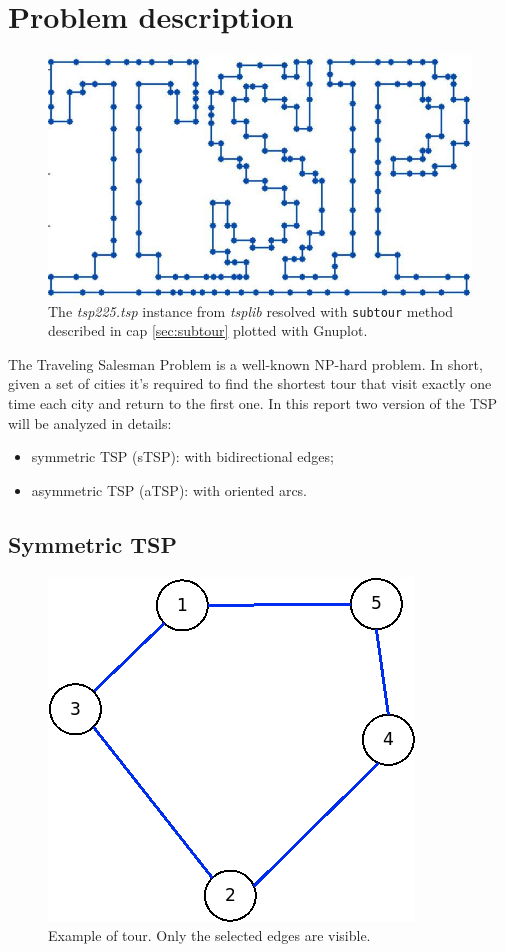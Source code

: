 \chapter{Problem description}
\label{chapter:TSPdescription}
\begin{figure}[h]
	\centering
	\includegraphics[width=.5\columnwidth]{img/tsp225_plot}
	\caption{The \textit{tsp225.tsp} instance from \textit{tsplib} resolved with \texttt{subtour} method described in cap \ref{sec:subtour} plotted with Gnuplot.}
	\label{fig:tsp225}
\end{figure}

The Traveling Salesman Problem is a well-known NP-hard problem. In short, given a set of cities it's required to find the shortest tour that visit exactly one time each city and return to the first one.
In this report two version of the TSP will be analyzed in details:
\begin{itemize}
	\item symmetric TSP (sTSP): with bidirectional edges;
 	\item asymmetric TSP (aTSP): with oriented arcs.
\end{itemize}


\section{Symmetric TSP}

\begin{figure}[h]
	\centering
	\includegraphics[width=.3\columnwidth]{img/symTSP_example.png}
	\caption{Example of tour. Only the selected edges are visible.}
	\label{fig:symTSP}
\end{figure}

